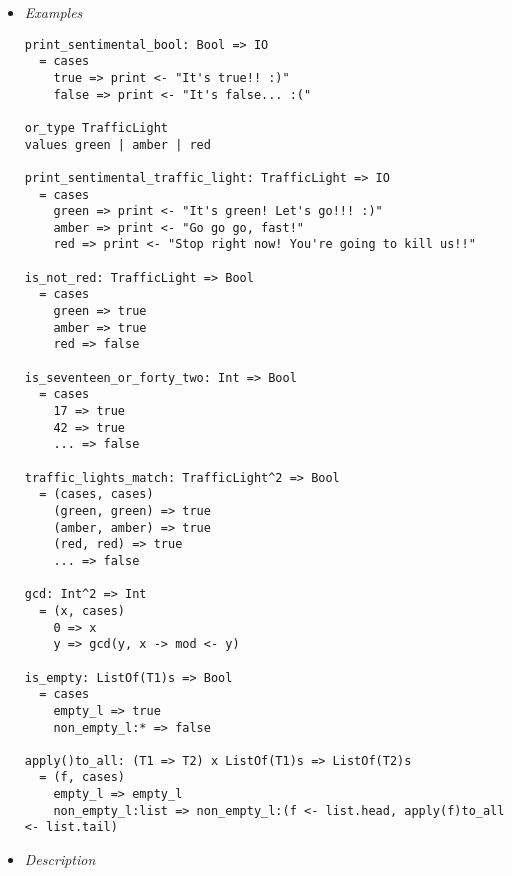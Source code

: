 \documentclass{article}
\begin{document}
\begin{itemize}
\item \textit{Examples}

\begin{verbatim}
print_sentimental_bool: Bool => IO
  = cases
    true => print <- "It's true!! :)"
    false => print <- "It's false... :("

or_type TrafficLight
values green | amber | red

print_sentimental_traffic_light: TrafficLight => IO
  = cases
    green => print <- "It's green! Let's go!!! :)"
    amber => print <- "Go go go, fast!"
    red => print <- "Stop right now! You're going to kill us!!"

is_not_red: TrafficLight => Bool
  = cases
    green => true
    amber => true
    red => false

is_seventeen_or_forty_two: Int => Bool
  = cases
    17 => true
    42 => true
    ... => false

traffic_lights_match: TrafficLight^2 => Bool
  = (cases, cases)
    (green, green) => true
    (amber, amber) => true
    (red, red) => true
    ... => false

gcd: Int^2 => Int
  = (x, cases)
    0 => x
    y => gcd(y, x -> mod <- y) 

is_empty: ListOf(T1)s => Bool
  = cases
    empty_l => true
    non_empty_l:* => false

apply()to_all: (T1 => T2) x ListOf(T1)s => ListOf(T2)s
  = (f, cases)
    empty_l => empty_l
    non_empty_l:list => non_empty_l:(f <- list.head, apply(f)to_all <- list.tail)

\end{verbatim}

\item \textit{Description}


\end{itemize}
\end{document}

